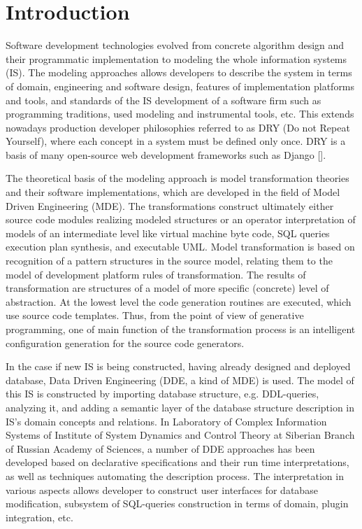 \documentclass[conference]{IEEEtran}
\begin{document}
%
\IEEEpeerreviewmaketitle



\section{Introduction}
Software development technologies evolved from concrete algorithm design and their programmatic implementation to modeling the whole information systems (IS).  The modeling approaches allows developers to describe the system in terms of domain, engineering and software design, features of implementation platforms and tools, and standards of the IS development of a software firm such as programming traditions, used modeling and instrumental tools, etc.  This extends nowadays production developer philosophies referred to as DRY (Do not Repeat Yourself), where each concept in a system must be defined only once.  DRY is a basis of many open-source web development frameworks such as Django [].

The theoretical basis of the modeling approach is model transformation theories and their software implementations, which are developed in the field of Model Driven Engineering (MDE).  The transformations construct ultimately either source code modules realizing modeled structures or an operator interpretation of models of an intermediate level like virtual machine byte code, SQL queries execution plan synthesis, and executable UML.  Model transformation is based on recognition of a pattern structures in the source model, relating them to the model of development platform rules of transformation.  The results of transformation are  structures of a model of more specific (concrete) level of abstraction.  At the lowest level the code generation routines are executed, which use source code templates.  Thus, from the point of view of generative programming, one of main function of the transformation process is an intelligent configuration generation for the source code generators.

In the case if new IS is being constructed, having already designed and deployed database, Data Driven Engineering (DDE, a kind of MDE) is used.  The model of this IS is constructed by importing database structure, e.g. DDL-queries, analyzing it, and adding a semantic layer of the database structure description in IS's domain concepts and relations.  In Laboratory of Complex Information Systems of Institute of System Dynamics and Control Theory at Siberian Branch of Russian Academy of Sciences, a number of DDE approaches has been developed based on declarative specifications and their run time interpretations, as well as techniques automating the description process.  The interpretation in various aspects allows developer to construct user interfaces for database modification, subsystem of SQL-queries construction in terms of domain, plugin integration, etc.
\end{document}
